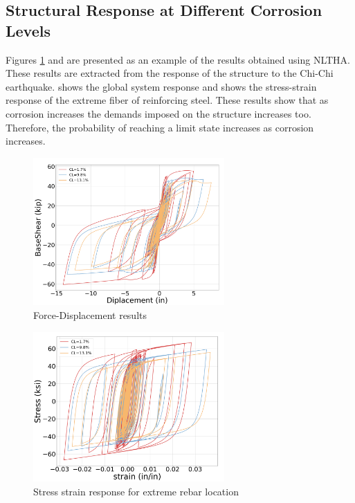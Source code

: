 \subsection{Structural Response at Different Corrosion Levels}
Figures \ref{fig:Force-Displacement_Results} and  are presented as an example of the results obtained using NLTHA. These results are extracted from the response of the structure to the Chi-Chi earthquake.  shows the global system response and  shows the stress-strain response of the extreme fiber of reinforcing steel. These results show that as corrosion increases the demands imposed on the structure increases too. Therefore, the probability of reaching a limit state increases as corrosion increases.

\begin{figure}[htbp]
	\centering
	\includegraphics[width=0.65\textwidth]{Chapter-5/figs/ForceDisplacement_01}
	\caption{Force-Displacement results}
	\label{fig:Force-Displacement_Results}
\end{figure}
\begin{figure}[htbp]
	\centering
	\includegraphics[width=0.65\textwidth]{Chapter-5/figs/Steel_StressStrain}
	\caption{Stress strain response for extreme rebar location}
	\label{fig:Steel_Stress_Strain_Response}
\end{figure}

